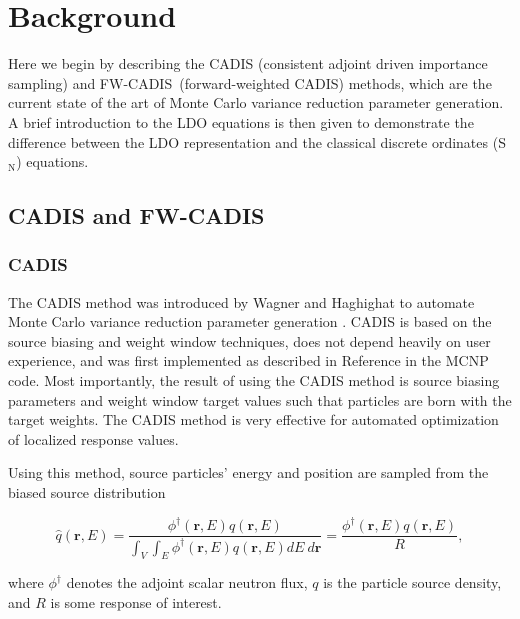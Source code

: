 \documentclass{article} %
\newcommand{\vecr}{\textbf{r}}
\newcommand{\sn}{S$_\mathrm{N}$}
\newcommand{\qhat}{\ensuremath{\hat{q}}}
\newcommand{\fwc}{\mbox{FW-CADIS}}
\begin{document}
\section{Background}
\label{sec:background}

Here we begin by describing the CADIS (consistent adjoint driven importance
sampling) and \fwc\ (forward-weighted CADIS) methods, which are the current
state of the art of Monte Carlo variance reduction parameter generation. A
brief introduction to the LDO equations is then given to demonstrate
the difference between the LDO representation and the classical discrete
ordinates (\sn) equations.

\subsection{CADIS and \fwc}

\subsubsection{CADIS}

The CADIS method was introduced by Wagner and Haghighat to automate Monte
Carlo variance reduction parameter generation \cite{cadis}. CADIS is based on
the source biasing and weight window techniques, does not depend heavily on
user experience, and was first implemented as described in Reference
\cite{cadis} in the MCNP code. Most importantly, the result of using the CADIS
method is source biasing parameters and weight window target values such that
particles are born with the target weights. The CADIS method is very effective
for automated optimization of localized response values.

Using this method, source particles' energy and position are sampled from the
biased source distribution

\begin{equation}
\qhat(\vecr,E) = 
\frac{\phi^{\dagger}(\vecr,E)q(\vecr,E)}
{\int_V\int_E\phi^{\dagger}(\vecr,E)q(\vecr,E) dE\ d\vecr} 
= \frac{\phi^{\dagger}(\vecr,E)q(\vecr,E)}{R},
\label{eq:cadis_sb}
\end{equation}

\noindent where $\phi^{\dagger}$ denotes the adjoint scalar neutron flux, $q$
is the particle source density, and $R$ is some response of interest.
\end{document}
